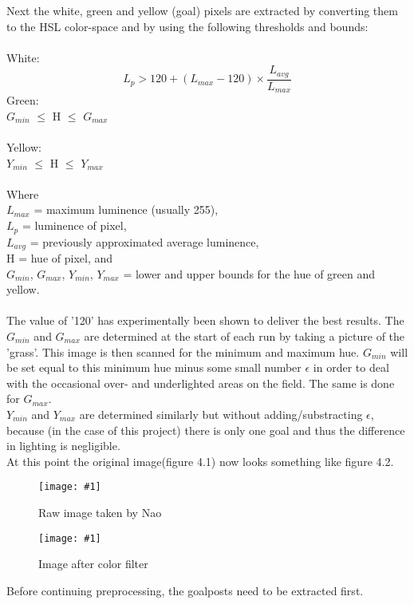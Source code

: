 \documentclass{ba-kecs}
\numberwithin{figure}{section}
\numberwithin{equation}{section}
\newcommand{\dkepic}[2]{ %
	\begin{figure}[H] %
	\texttt{[image: \#1]}
	\caption{#2}
	\label{#1}
	\end{figure}
}
\begin{document}
Next the white, green and yellow (goal) pixels are extracted by converting them to the HSL color-space and by using the following thresholds and bounds:\\ \\
White:
\[ L_{p} > 120 + (L_{max}-120) \times \frac{L_{avg}}{L_{max}} \]
Green:\\ $G_{min}$ $\leq$ H $\leq$ $G_{max}$\\ \\
Yellow:\\ $Y_{min}$ $\leq$ H $\leq$ $Y_{max}$\\ \\
Where \\
$L_{max}$ = maximum luminence (usually 255),\\
$L_{p}$ = luminence of pixel, \\
$L_{avg}$ = previously approximated average luminence, \\
H = hue of pixel, and \\
$G_{min}$, $G_{max}$, $Y_{min}$, $Y_{max}$ = lower and upper bounds for the hue of green and yellow.\\ \\
The value of '120' has experimentally been shown to deliver the best results. The $G_{min}$ and $G_{max}$ are determined at the start of each run by taking a picture of the 'grass'. This image is then scanned for the minimum and maximum hue. $G_{min}$ will be set equal to this minimum hue minus some small number $\epsilon$ in order to deal with the occasional over- and underlighted areas on the field. The same is done for $G_{max}$.\\
$Y_{min}$ and $Y_{max}$ are determined similarly but without adding/substracting $\epsilon$, because (in the case of this project) there is only one goal and thus the difference in lighting is negligible.\\
At this point the original image(figure 4.1) now looks something like figure 4.2.\\
\dkepic{figure_IP1}{Raw image taken by Nao}
\dkepic{figure_IP2}{Image after color filter}
Before continuing preprocessing, the goalposts need to be extracted first.
\end{document}
